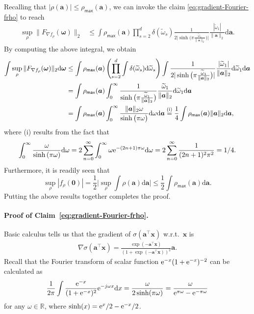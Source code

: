 \documentclass[english]{article}
\begin{document}
Recalling that $|\rho({\bm a})|\le \rho_{\mathsf{max}}({\bm a})$, we can invoke the claim \eqref{eq:gradient-Fourier-frho} to reach
%
\begin{align*}
\sup_{\rho}\|F_{\nabla f_{\rho}}({\bm \omega})\|_2 &\le \int \rho_{\mathsf{max}}({\bm a})\prod_{s=2}^d\delta(\widetilde{\omega}_s)\frac{1}{2\big|\sinh\big(\pi\frac{\widetilde{\omega}_1}{\|{\bm a}\|_2}\big)\big|}\frac{|\widetilde{\omega}_1|}{\|{\bm a}\|_2} \mathrm{d} {\bm a}.
\end{align*}
%
By computing the above integral, we obtain
%
\begin{align*}
\int \sup_{\rho}\|F_{\nabla f_{\rho}}({\bm \omega})\|_2 \mathrm{d}{\bm \omega} &\le \int \rho_{\mathsf{max}}({\bm a})\left(\prod_{s=2}^d\int\delta(\widetilde{\omega}_s)\mathrm{d} \widetilde{\omega}_s\right)\int \frac{1}{2|\sinh\big(\pi\frac{\widetilde{\omega}_1}{\|{\bm a}\|_2}\big)|}\frac{|\widetilde{\omega}_1|}{\|{\bm a}\|_2} \mathrm{d} \widetilde{\omega}_1 \mathrm{d} {\bm a}\notag\\
&= \int \rho_{\mathsf{max}}({\bm a})\int_0^{\infty} \frac{1}{\sinh\big(\pi\frac{\widetilde{\omega}_1}{\|{\bm a}\|_2}\big)}\frac{\widetilde{\omega}_1}{\|{\bm a}\|_2} \mathrm{d} \widetilde{\omega}_1 \mathrm{d} {\bm a}\notag\\
&= \int \rho_{\mathsf{max}}({\bm a})\int_0^{\infty} \frac{\|{\bm a}\|_2\omega}{\sinh\big(\pi\omega\big)}\mathrm{d} {\omega}\mathrm{d} {\bm a} \overset{\text{(i)}}{=} \frac14\int \rho_{\mathsf{max}}({\bm a})\|{\bm a}\|_2\mathrm{d} {\bm a},
\end{align*}
where (i) results from the fact that $$\int_{0}^{\infty} \frac{\omega}{\sinh\left(\pi\omega\right)} \mathrm{d} {\omega} = 2\sum_{n=0}^{\infty}\int_{0}^{\infty}\omega{\rm e}^{-(2n+1)\pi \omega}\mathrm{d}\omega = 2\sum_{n=0}^{\infty}\frac{1}{(2n+1)^2\pi^2} = 1/4.$$
%
Furthermore, it is readily seen that
$$
\sup_{\rho} |f_{\rho}({\bm 0})| = \frac12\bigg|\sup_{\rho}\int \rho({\bm a}) \mathrm{d}{\bm a}\bigg| \le \frac12\int \rho_{\mathsf{max}}({\bm a}) \mathrm{d}{\bm a}.
$$
Putting the above results together completes the proof.

\paragraph{Proof of Claim~\eqref{eq:gradient-Fourier-frho}.}
Basic calculus tells us that the gradient of $\sigma({\bm a}^{\top}{\bm x})$ w.r.t.~${\bm x}$ is
%
\begin{align}
\nabla \sigma({\bm a}^{\top}{\bm x}) = \frac{\exp(-{\bm a}^{\top}{\bm x})}{\left(1+\exp(-{\bm a}^{\top}{\bm x})\right)^2} {\bm a}.
\label{eq:grad-f-logistic}
\end{align}
%
Recall that the Fourier transform of scalar function ${\rm e}^{-x}(1+{\rm e}^{-x})^{-2}$ can be calculated as
%
\begin{align}
\label{eq:FT-sigmoid}
\frac{1}{2\pi}\int \frac{{\rm e}^{-x}}{(1+{\rm e}^{-x})^2}{\rm e}^{-j\omega x}\mathrm{d} x
= \frac{\omega}{2\sinh(\pi\omega)}= \frac{\omega}{{\rm e}^{\pi\omega} - {\rm e}^{-\pi\omega}}
\end{align}
for any $\omega \in \mathbb{R}$, 
where $\sinh(x) = {\rm e}^x/2 - {\rm e}^{-x}/2$.
\end{document}

